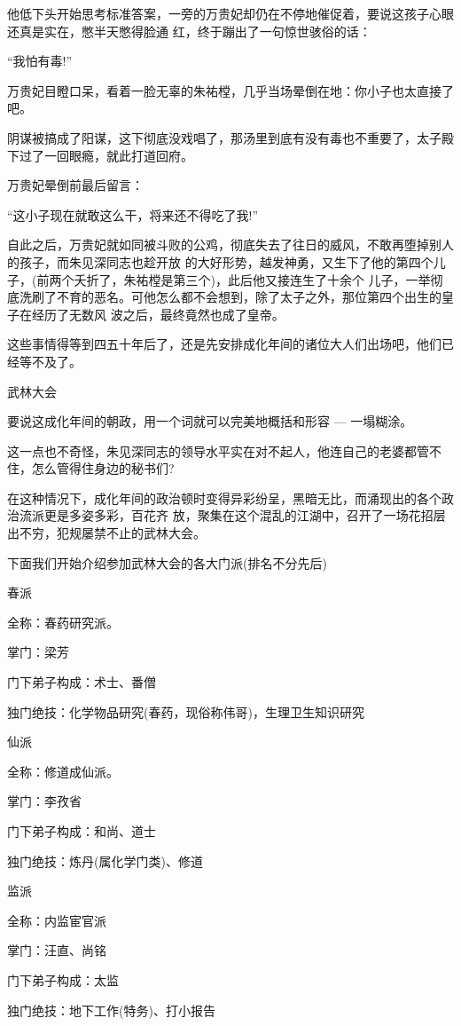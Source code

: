\documentclass[11pt,a4paper,onecolumn]{article}
\begin{document}
他低下头开始思考标准答案，一旁的万贵妃却仍在不停地催促着，要说这孩子心眼还真是实在，憋半天憋得脸通
红，终于蹦出了一句惊世骇俗的话：

``我怕有毒!''

万贵妃目瞪口呆，看着一脸无辜的朱祐樘，几乎当场晕倒在地：你小子也太直接了吧。

阴谋被搞成了阳谋，这下彻底没戏唱了，那汤里到底有没有毒也不重要了，太子殿下过了一回眼瘾，就此打道回府。

万贵妃晕倒前最后留言：

``这小子现在就敢这么干，将来还不得吃了我!''

自此之后，万贵妃就如同被斗败的公鸡，彻底失去了往日的威风，不敢再堕掉别人的孩子，而朱见深同志也趁开放
的大好形势，越发神勇，又生下了他的第四个儿子，(前两个夭折了，朱祐樘是第三个)，此后他又接连生了十余个
儿子，一举彻底洗刷了不育的恶名。可他怎么都不会想到，除了太子之外，那位第四个出生的皇子在经历了无数风
波之后，最终竟然也成了皇帝。

这些事情得等到四五十年后了，还是先安排成化年间的诸位大人们出场吧，他们已经等不及了。

武林大会

要说这成化年间的朝政，用一个词就可以完美地概括和形容 --- 一塌糊涂。

这一点也不奇怪，朱见深同志的领导水平实在对不起人，他连自己的老婆都管不住，怎么管得住身边的秘书们?

在这种情况下，成化年间的政治顿时变得异彩纷呈，黑暗无比，而涌现出的各个政治流派更是多姿多彩，百花齐
放，聚集在这个混乱的江湖中，召开了一场花招层出不穷，犯规屡禁不止的武林大会。

下面我们开始介绍参加武林大会的各大门派(排名不分先后)

春派

全称：春药研究派。

掌门：梁芳

门下弟子构成：术士、番僧

独门绝技：化学物品研究(春药，现俗称伟哥)，生理卫生知识研究

仙派

全称：修道成仙派。

掌门：李孜省

门下弟子构成：和尚、道士

独门绝技：炼丹(属化学门类)、修道

监派

全称：内监宦官派

掌门：汪直、尚铭

门下弟子构成：太监

独门绝技：地下工作(特务)、打小报告
\end{document}
